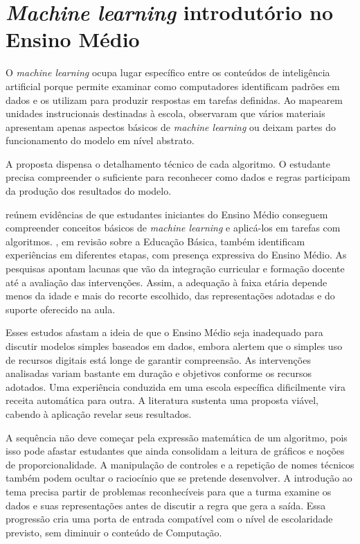 \section{\textit{Machine learning} introdutório no Ensino Médio}

O \textit{machine learning} ocupa lugar específico entre os conteúdos de inteligência artificial porque permite examinar como computadores identificam padrões em dados e os utilizam para produzir respostas em tarefas definidas. Ao mapearem unidades instrucionais destinadas à escola,  observaram que vários materiais apresentam apenas aspectos básicos de \textit{machine learning} ou deixam partes do funcionamento do modelo em nível abstrato.

A proposta dispensa o detalhamento técnico de cada algoritmo. O estudante precisa compreender o suficiente para reconhecer como dados e regras participam da produção dos resultados do modelo.

 reúnem evidências de que estudantes iniciantes do Ensino Médio conseguem compreender conceitos básicos de \textit{machine learning} e aplicá-los em tarefas com algoritmos. , em revisão sobre a Educação Básica, também identificam experiências em diferentes etapas, com presença expressiva do Ensino Médio. As pesquisas apontam lacunas que vão da integração curricular e formação docente até a avaliação das intervenções. Assim, a adequação à faixa etária depende menos da idade e mais do recorte escolhido, das representações adotadas e do suporte oferecido na aula.

Esses estudos afastam a ideia de que o Ensino Médio seja inadequado para discutir modelos simples baseados em dados, embora alertem que o simples uso de recursos digitais está longe de garantir compreensão. As intervenções analisadas variam bastante em duração e objetivos conforme os recursos adotados. Uma experiência conduzida em uma escola específica dificilmente vira receita automática para outra. A literatura sustenta uma proposta viável, cabendo à aplicação revelar seus resultados.

A sequência não deve começar pela expressão matemática de um algoritmo, pois isso pode afastar estudantes que ainda consolidam a leitura de gráficos e noções de proporcionalidade. A manipulação de controles e a repetição de nomes técnicos também podem ocultar o raciocínio que se pretende desenvolver. A introdução ao tema precisa partir de problemas reconhecíveis para que a turma examine os dados e suas representações antes de discutir a regra que gera a saída. Essa progressão cria uma porta de entrada compatível com o nível de escolaridade previsto, sem diminuir o conteúdo de Computação.

